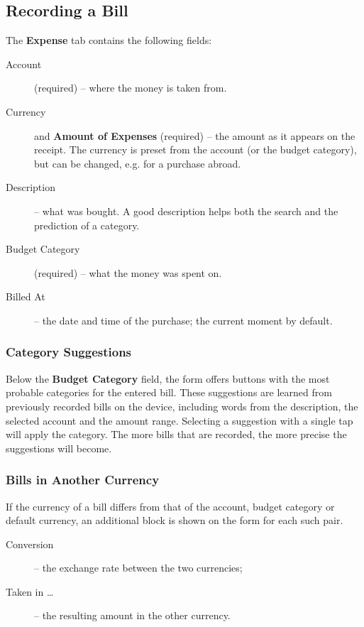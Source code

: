 \subsection{Recording a Bill}

The \textbf{Expense} tab contains the following fields:

\begin{description}
  \item[Account] (required) -- where the money is taken from.
  \item[Currency] and \textbf{Amount of Expenses} (required) -- the amount as it appears on
  the receipt. The currency is preset from the account (or the budget category), but can be
  changed, e.g. for a purchase abroad.
  \item[Description] -- what was bought. A good description helps both the search and the
  prediction of a category.
  \item[Budget Category] (required) -- what the money was spent on.
  \item[Billed At] -- the date and time of the purchase; the current moment by default.
\end{description}


\subsubsection{Category Suggestions}

Below the \textbf{Budget Category} field, the form offers buttons with the most probable
categories for the entered bill. These suggestions are learned from previously recorded bills
on the device, including words from the description, the selected account and the amount
range. Selecting a suggestion with a single tap will apply the category. The more bills that
are recorded, the more precise the suggestions will become.


\subsubsection{Bills in Another Currency}

If the currency of a bill differs from that of the account, budget category or default
currency, an additional block is shown on the form for each such pair.

\begin{description}
  \item[Conversion] -- the exchange rate between the two currencies;
  \item[Taken in \dots] -- the resulting amount in the other currency.
\end{description}

